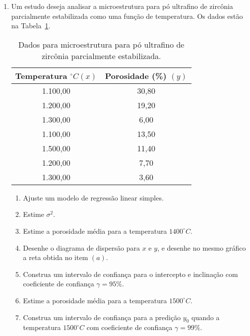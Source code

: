 \documentclass[12pt, a4paper]{article}
\begin{document}
\begin{enumerate}
	\item Um estudo deseja analisar a microestrutura para pó ultrafino de zircônia parcialmente estabilizada como uma função de temperatura. Os dados estão na Tabela~\ref{tab:zirconia}.
	\begin{table}[ht]
		\centering
		\begin{tabular}{c|c}
			\toprule
			Temperatura $^\circ C(x)$ & Porosidade (\%) $(y)$ \\ 
			\midrule
			1.100,00 & 30,80 \\ 
			1.200,00 & 19,20 \\ 
			1.300,00 & 6,00 \\ 
			1.100,00 & 13,50 \\ 
			1.500,00 & 11,40 \\ 
			1.200,00 & 7,70 \\ 
			1.300,00 & 3,60 \\ 
			\bottomrule
		\end{tabular}
		\caption{Dados para microestrutura para pó ultrafino de zircônia parcialmente estabilizada.} 
		\label{tab:zirconia}
	\end{table}
	\begin{enumerate}
		\item Ajuste um modelo de regressão linear simples.
		\item Estime $\sigma^2$.
		\item Estime a porosidade média para a temperatura $1400^\circ C$.
		\item Desenhe o diagrama de dispersão para $x$ e $y$, e desenhe no mesmo gráfico a reta obtida no item $(a)$.
		\item Construa um intervalo de confiança para o intercepto e inclinação com coeficiente de confiança $\gamma=95\%$.
		\item Estime a porosidade média para a temperatura $1500^\circ C$.
		\item Construa um intervalo de confiança para a predição $y_0$ quando a temperatura $1500^\circ C$ com coeficiente de confiança $\gamma=99\%$.
	\end{enumerate}


\end{enumerate}
\end{document}
